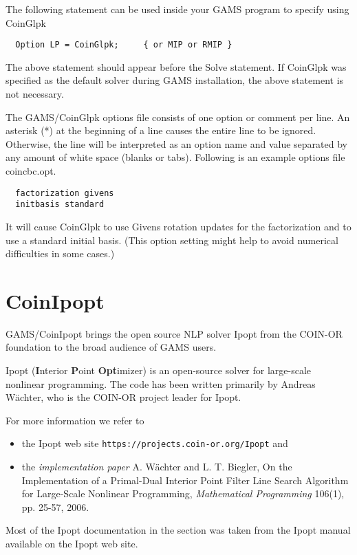The following statement can be used inside your GAMS program to specify using CoinGlpk
\begin{verbatim}
  Option LP = CoinGlpk;     { or MIP or RMIP }
\end{verbatim}

The above statement should appear before the Solve statement.
If CoinGlpk was specified as the default solver during GAMS installation, the above statement is not necessary.

The GAMS/CoinGlpk options file consists of one option or comment per line.
An asterisk (*) at the beginning of a line causes the entire line to be ignored.
Otherwise, the line will be interpreted as an option name and value separated by any amount of white space (blanks or tabs).
Following is an example options file coincbc.opt.
\begin{verbatim}
  factorization givens
  initbasis standard
\end{verbatim}
It will cause CoinGlpk to use Givens rotation updates for the factorization and to use a standard initial basis. (This option setting might help to avoid numerical difficulties in some cases.)






\section{CoinIpopt}

GAMS/CoinIpopt brings the open source NLP solver Ipopt from the COIN-OR foundation to the broad audience of GAMS users.

Ipopt (\textbf{I}nterior \textbf{P}oint \textbf{Opt}imizer) is an open-source solver for large-scale nonlinear programming.
The code has been written primarily by Andreas W\"achter, who is the COIN-OR project leader for Ipopt.

For more information we refer to
\begin{itemize}
\item the Ipopt web site \texttt{https://projects.coin-or.org/Ipopt} and
\item the \emph{implementation paper} A. W\"achter and L. T. Biegler, On the Implementation of a Primal-Dual Interior Point Filter Line Search Algorithm for Large-Scale Nonlinear Programming, \emph{Mathematical Programming} 106(1), pp. 25-57, 2006.
\end{itemize}
Most of the Ipopt documentation in the section was taken from the Ipopt manual available on the Ipopt web site.

